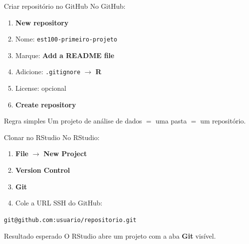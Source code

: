 \documentclass[10pt,aspectratio=169]{beamer}
\begin{document}
\begin{frame}{Criar repositório no GitHub}
\large
No GitHub:

\vspace{0.25cm}
\begin{enumerate}
  \item \textbf{New repository}
  \item Nome: \texttt{est100-primeiro-projeto}
  \item Marque: \textbf{Add a README file}
  \item Adicione: \texttt{.gitignore} $\rightarrow$ \textbf{R}
  \item License: opcional
  \item \textbf{Create repository}
\end{enumerate}

\vspace{0.35cm}
\begin{block}{Regra simples}
Um projeto de análise de dados $=$ uma pasta $=$ um repositório.
\end{block}
\end{frame}

\begin{frame}{Clonar no RStudio}
\large
No RStudio:

\vspace{0.25cm}
\begin{enumerate}
  \item \textbf{File} $\rightarrow$ \textbf{New Project}
  \item \textbf{Version Control}
  \item \textbf{Git}
  \item Cole a URL SSH do GitHub:
\end{enumerate}

\vspace{0.15cm}
\begin{center}
\texttt{git@github.com:usuario/repositorio.git}
\end{center}

\vspace{0.25cm}
\begin{block}{Resultado esperado}
O RStudio abre um projeto com a aba \textbf{Git} visível.
\end{block}
\end{frame}
\end{document}

